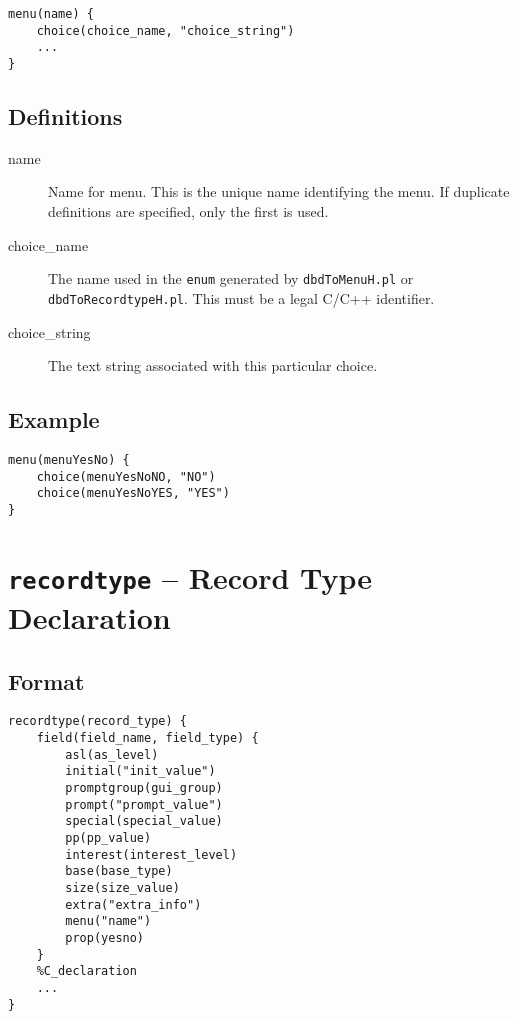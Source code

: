 \begin{verbatim}
menu(name) {
    choice(choice_name, "choice_string")
    ...
}
\end{verbatim}

\subsection{Definitions}

\begin{description}
\item [name] Name for menu. This is the unique name identifying the menu.
If duplicate definitions are specified, only the first is used.

\item [choice\_name] The name used in the \verb|enum| generated by \verb|dbdToMenuH.pl| or \verb|dbdToRecordtypeH.pl|.
This must be a legal C/C++ identifier.

\item [choice\_string] The text string associated with this particular choice.
\end{description}

\subsection{Example}

\begin{verbatim}
menu(menuYesNo) {
    choice(menuYesNoNO, "NO")
    choice(menuYesNoYES, "YES")
}
\end{verbatim}

\section{\texttt{recordtype} -- Record Type Declaration}

\subsection{Format}

\begin{verbatim}
recordtype(record_type) {
    field(field_name, field_type) {
        asl(as_level)
        initial("init_value")
        promptgroup(gui_group)
        prompt("prompt_value")
        special(special_value)
        pp(pp_value)
        interest(interest_level)
        base(base_type)
        size(size_value)
        extra("extra_info")
        menu("name")
        prop(yesno)
    }
    %C_declaration
    ...
}
\end{verbatim}

